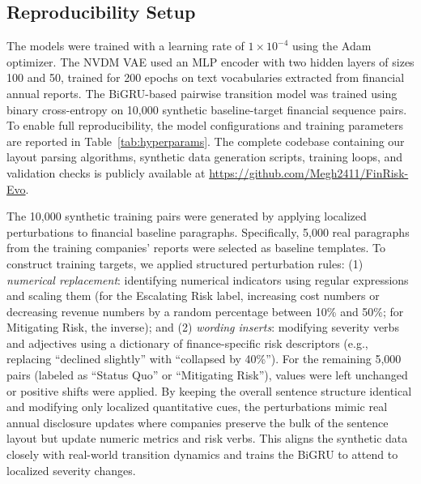 \documentclass[journal]{IEEEtran}
\begin{document}
\subsection{Reproducibility Setup}
The models were trained with a learning rate of $1\times10^{-4}$ using the Adam optimizer. The NVDM VAE used an MLP encoder with two hidden layers of sizes 100 and 50, trained for 200 epochs on text vocabularies extracted from financial annual reports. The BiGRU-based pairwise transition model was trained using binary cross-entropy on 10,000 synthetic baseline-target financial sequence pairs. To enable full reproducibility, the model configurations and training parameters are reported in Table~\ref{tab:hyperparams}. The complete codebase containing our layout parsing algorithms, synthetic data generation scripts, training loops, and validation checks is publicly available at \url{https://github.com/Megh2411/FinRisk-Evo}.

The 10,000 synthetic training pairs were generated by applying localized perturbations to financial baseline paragraphs. Specifically, 5,000 real paragraphs from the training companies' reports were selected as baseline templates. To construct training targets, we applied structured perturbation rules: (1) \textit{numerical replacement}: identifying numerical indicators using regular expressions and scaling them (for the Escalating Risk label, increasing cost numbers or decreasing revenue numbers by a random percentage between 10\% and 50\%; for Mitigating Risk, the inverse); and (2) \textit{wording inserts}: modifying severity verbs and adjectives using a dictionary of finance-specific risk descriptors (e.g., replacing ``declined slightly'' with ``collapsed by 40\%''). For the remaining 5,000 pairs (labeled as ``Status Quo'' or ``Mitigating Risk''), values were left unchanged or positive shifts were applied. By keeping the overall sentence structure identical and modifying only localized quantitative cues, the perturbations mimic real annual disclosure updates where companies preserve the bulk of the sentence layout but update numeric metrics and risk verbs. This aligns the synthetic data closely with real-world transition dynamics and trains the BiGRU to attend to localized severity changes.
\end{document}
